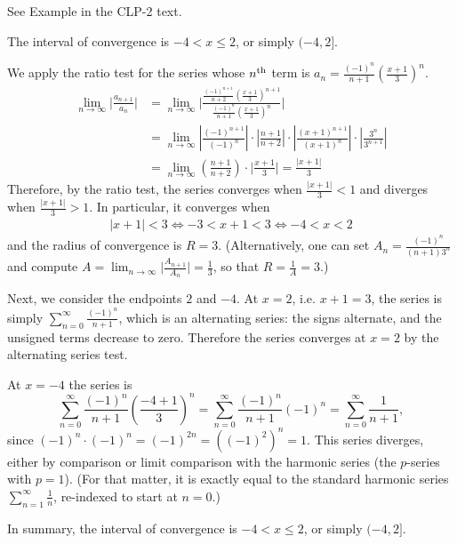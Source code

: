 \begin{hint}
See Example  in the
CLP-2 text.
\end{hint}

\begin{answer}
The interval of convergence is $-4<x\le2$, or simply $(-4,2]$.
\end{answer}

\begin{solution}
We apply the ratio test for the series whose $n^{\rm th}$
term is $a_n= \frac{(-1)^n}{n+1} \left(\frac{x+1}{3}\right)^n$.
\begin{align*}
\lim_{n\to\infty} \bigg| \frac{a_{n+1}}{a_n} \bigg|
&= \lim_{n\to\infty} \bigg| \frac{ \frac{(-1)^{n+1}}{n+2} \left(\frac{x+1}{3}\right)^{n+1}}
                       { \frac{(-1)^n}{n+1} \left(\frac{x+1}{3}\right)^n} \bigg| \\
&= \lim_{n\to\infty}\left|\frac{(-1)^{n+1}}{(-1)^n} \right|\cdot\left|\frac{n+1}{n+2} \right|\cdot\left|\frac{(x+1)^{n+1}}{(x+1)^n} \right|\cdot\left|\frac{3^n}{3^{n+1}} \right| \\
&= \lim_{n\to\infty} \left(\frac{n+1}{n+2}\right)\cdot \bigg| \frac{x+1}3 \bigg| = \frac{|x+1|}3
\end{align*}
Therefore, by the ratio test, the series converges when $\frac{|x+1|}3 < 1$
and diverges when $\frac{|x+1|}3 > 1$. In particular, it converges when
\begin{align*}
|x+1| < 3 \iff -3 < x+1 < 3 \iff -4 < x < 2
\end{align*}
and the radius of convergence is $R = 3$. (Alternatively, one can set $A_n = \frac{(-1)^n}{(n+1)3^n}$ and compute
$A = \lim_{n\to\infty} \big| \frac{A_{n+1}}{A_n}\big| = \frac{1}{3}$, so that
$R=\frac{1}{A}=3$.)

Next, we consider the endpoints $2$ and $-4$.
At $x=2$, i.e. $x+1=3$, the series is simply $\sum_{n=0}^\infty \frac{(-1)^{n}}{n+1}$,
which is an alternating series: the signs alternate, and the unsigned terms decrease to zero. Therefore the series converges at $x=2$ by the alternating series test.

At $x=-4$ the series is
$$\sum_{n=0}^\infty \frac{(-1)^{n}}{n+1} \left(\frac{-4+1}{3}\right)^n
 = \sum_{n=0}^\infty \frac{(-1)^{n}}{n+1} (-1)^n
 = \sum_{n=0}^\infty \frac1{n+1},$$
since $(-1)^n \cdot (-1)^n = (-1)^{2n} = \left((-1)^2\right)^n = 1$.
This series diverges, either by comparison or limit comparison with the harmonic series (the $p$-series with $p=1$). (For that matter, it is exactly equal to the standard harmonic
series $\sum_{n=1}^\infty \frac{1}{n}$, re-indexed to start at $n=0$.)

In summary, the interval of convergence is $-4<x\le2$, or simply $(-4,2]$.


\end{solution}



